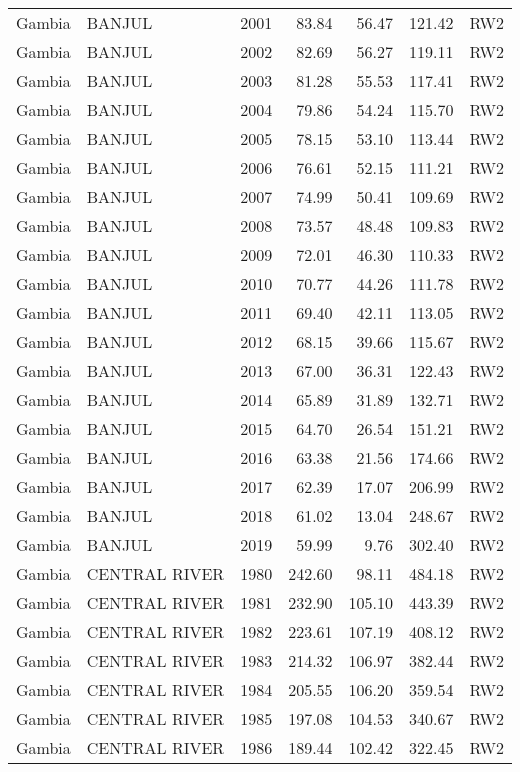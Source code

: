 \begin{longtable}{lllrrrl}
  Gambia & BANJUL & 2001 & 83.84 & 56.47 & 121.42 & RW2 \\ 
  Gambia & BANJUL & 2002 & 82.69 & 56.27 & 119.11 & RW2 \\ 
  Gambia & BANJUL & 2003 & 81.28 & 55.53 & 117.41 & RW2 \\ 
  Gambia & BANJUL & 2004 & 79.86 & 54.24 & 115.70 & RW2 \\ 
  Gambia & BANJUL & 2005 & 78.15 & 53.10 & 113.44 & RW2 \\ 
  Gambia & BANJUL & 2006 & 76.61 & 52.15 & 111.21 & RW2 \\ 
  Gambia & BANJUL & 2007 & 74.99 & 50.41 & 109.69 & RW2 \\ 
  Gambia & BANJUL & 2008 & 73.57 & 48.48 & 109.83 & RW2 \\ 
  Gambia & BANJUL & 2009 & 72.01 & 46.30 & 110.33 & RW2 \\ 
  Gambia & BANJUL & 2010 & 70.77 & 44.26 & 111.78 & RW2 \\ 
  Gambia & BANJUL & 2011 & 69.40 & 42.11 & 113.05 & RW2 \\ 
  Gambia & BANJUL & 2012 & 68.15 & 39.66 & 115.67 & RW2 \\ 
  Gambia & BANJUL & 2013 & 67.00 & 36.31 & 122.43 & RW2 \\ 
  Gambia & BANJUL & 2014 & 65.89 & 31.89 & 132.71 & RW2 \\ 
  Gambia & BANJUL & 2015 & 64.70 & 26.54 & 151.21 & RW2 \\ 
  Gambia & BANJUL & 2016 & 63.38 & 21.56 & 174.66 & RW2 \\ 
  Gambia & BANJUL & 2017 & 62.39 & 17.07 & 206.99 & RW2 \\ 
  Gambia & BANJUL & 2018 & 61.02 & 13.04 & 248.67 & RW2 \\ 
  Gambia & BANJUL & 2019 & 59.99 & 9.76 & 302.40 & RW2 \\ 
  Gambia & CENTRAL RIVER & 1980 & 242.60 & 98.11 & 484.18 & RW2 \\ 
  Gambia & CENTRAL RIVER & 1981 & 232.90 & 105.10 & 443.39 & RW2 \\ 
  Gambia & CENTRAL RIVER & 1982 & 223.61 & 107.19 & 408.12 & RW2 \\ 
  Gambia & CENTRAL RIVER & 1983 & 214.32 & 106.97 & 382.44 & RW2 \\ 
  Gambia & CENTRAL RIVER & 1984 & 205.55 & 106.20 & 359.54 & RW2 \\ 
  Gambia & CENTRAL RIVER & 1985 & 197.08 & 104.53 & 340.67 & RW2 \\ 
  Gambia & CENTRAL RIVER & 1986 & 189.44 & 102.42 & 322.45 & RW2 \\ 

\end{longtable}

